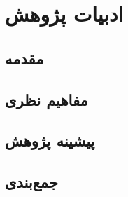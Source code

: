 \chapter{ادبیات پژوهش‌}
\section{مقدمه}
\section{مفاهیم نظری}
\section{پیشینه پژوهش}
\section{جمع‌بندی}
